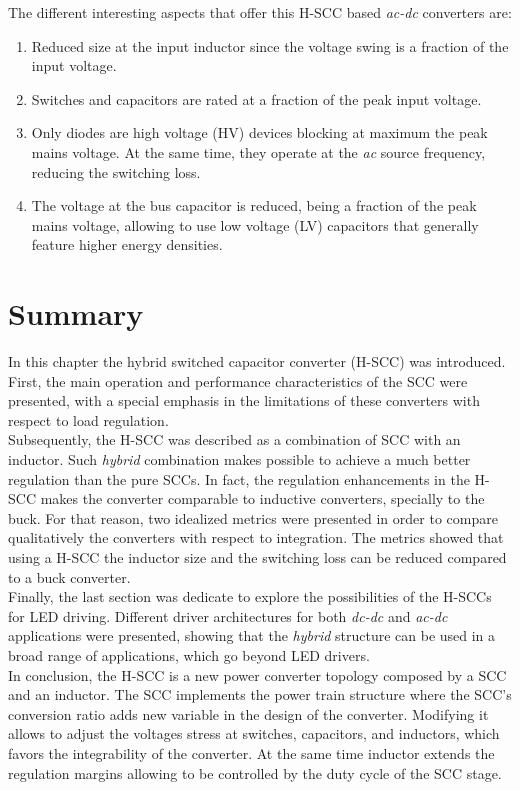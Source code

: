 The different interesting aspects that offer this H-SCC based \emph{ac-dc} converters are:
 \begin{enumerate}

   \item Reduced size at the input inductor since the voltage swing is a fraction of the input voltage.

   \item Switches and capacitors are rated at a fraction of the peak input voltage.

   \item Only diodes are high voltage (HV) devices blocking at maximum the peak mains voltage. At the same time, they operate at the \emph{ac} source frequency, reducing the switching loss.

   \item The voltage at the bus capacitor is reduced, being a fraction of the peak mains voltage, allowing to use low voltage (LV) capacitors that generally feature higher energy densities.
 \end{enumerate}

\section{Summary}

In this chapter the hybrid switched capacitor converter (H-SCC) was introduced. First, the main operation and performance characteristics of the SCC were presented, with a special emphasis in the limitations of these converters with respect to load  regulation.
\\

Subsequently, the H-SCC was described as a combination of SCC with an inductor. Such \emph{hybrid} combination makes possible to achieve a much better regulation than the pure SCCs. In fact, the regulation enhancements in the H-SCC  makes the converter comparable to inductive converters, specially to the buck. For that reason, two idealized metrics were presented in order to compare qualitatively the converters with respect to integration. The metrics showed that using a H-SCC the inductor size and the switching loss can be reduced compared to a buck converter.
\\

Finally, the last section was dedicate to explore the possibilities of the H-SCCs for LED driving. Different driver architectures for both \emph{dc-dc} and \emph{ac-dc} applications were presented, showing that the \emph{hybrid} structure can be used in a broad range of applications, which go beyond LED drivers.
\\

In conclusion, the H-SCC is a new power converter topology composed by a SCC and an inductor. The SCC implements the power train structure where the SCC's conversion ratio adds new variable in the design of the converter. Modifying it allows to adjust the voltages stress at switches, capacitors, and inductors, which favors the integrability of the converter. At the same time inductor  extends the regulation margins allowing to be controlled by the duty cycle of the SCC stage.


\clearpage

 